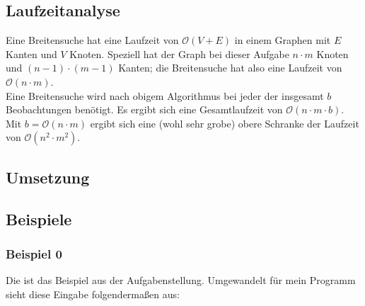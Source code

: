 \subsection{Laufzeitanalyse}
Eine Breitensuche hat eine Laufzeit von $\mathcal{O}(V + E)$ in einem Graphen mit $E$ Kanten und $V$ Knoten. Speziell hat der Graph bei dieser Aufgabe $n\cdot m$ Knoten und $(n-1)\cdot (m-1)$ Kanten; die Breitensuche hat also eine Laufzeit von $\mathcal{O}(n\cdot m)$.\\
Eine Breitensuche wird nach obigem Algorithmus bei jeder der insgesamt $b$ Beobachtungen benötigt. Es ergibt sich eine Gesamtlaufzeit von $\mathcal{O}(n\cdot m \cdot b)$. Mit $b = \mathcal{O}(n\cdot m)$ ergibt sich eine (wohl sehr grobe) obere Schranke der Laufzeit von $\mathcal{O}(n^2 \cdot m^2)$.

\subsection{Umsetzung}

\subsection{Beispiele}
\subsubsection{Beispiel 0}
Die ist das Beispiel aus der Aufgabenstellung. Umgewandelt für mein Programm sieht diese Eingabe folgendermaßen aus:\\
\begin{lstlisting}

\end{lstlisting}